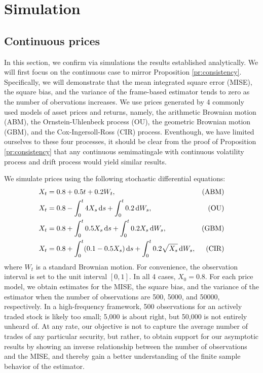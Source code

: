 \section{Simulation}\label{sec:simulation}
\subsection{Continuous prices}
In this section, we  confirm via simulations the results established analytically. We will first focus on the continuous case to mirror   Proposition \eqref{pr:consistency}.  Specifically, we will demonstrate that the mean integrated square error (MISE), the square bias, and the variance of the frame-based estimator tends to zero as the number of obervations increases.  We use prices generated by 4 commonly used models of asset prices and returns, namely, the  arithmetic Brownian motion (ABM),  the Ornstein-Uhlenbeck process (OU), the geometric Brownian motion (GBM), and the Cox-Ingersoll-Ross (CIR) process. Eventhough, we have limited ourselves to these four processes, it should be clear from the proof of Proposition \eqref{pr:consistency} that  any continuous \ito semimatingale with continuous volatility process and \cadlag drift process would yield similar results. 

We simulate prices using the following stochastic differential equations:
\begin{align}
  & X_t = 0.8 +  0.5  t + 0.2  W_t,\notag & \text{(ABM)}\\
  & X_t = 0.8 -\int_0^t 4 X_s \D s + \int^t_0 0.2 \D W_s,\notag & \text{(OU)}\\
  & X_t = 0.8 + \int_0^t 0.5 X_s \D s + \int^t_0 0.2 X_s \D W_s,\notag & \text{(GBM)}\\
  & X_t = 0.8 + \int_0^t(0.1 - 0.5 X_s) \D s +\int^t_0  0.2 \sqrt{X_s} \D W_s,\notag & \text{(CIR)}
  \label{}
\end{align}
where $W_t$ is a standard Brownian motion. For convenience, the observation interval is set to the unit interval $[0,1]$. In all 4 cases, $X_0 = 0.8$. For each price model, we obtain estimates for the MISE, the square bias, and the variance of the estimator  when the number of  observations are 500, 5000, and 50000, respectively. In a high-frequency framework, 500 observations for an actively traded stock is likely too small; 5,000 is about right, but 50,000 is not entirely unheard of. At any rate, our objective is not to capture the average number of trades of any particular security, but rather,  to obtain support for our asymptotic results by showing an inverse relationship between the number of observations and the MISE, and thereby gain a better understanding of the finite sample behavior of the estimator.

